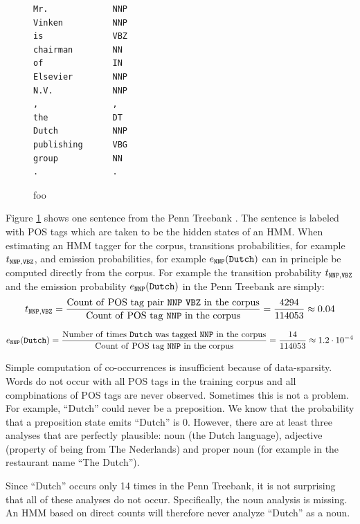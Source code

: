 \begin{figure}[!htb]
\begin{center}
\begin{BVerbatim}
Mr.             NNP
Vinken          NNP
is              VBZ
chairman        NN
of              IN
Elsevier        NNP
N.V.            NNP
,               ,
the             DT
Dutch           NNP
publishing      VBG
group           NN
.               .
\end{BVerbatim}
\end{center}
\caption{foo}\label{penn-figure}
\end{figure}

Figure \ref{penn-figure} shows one sentence from the Penn Treebank \citep{Marcus1993}. The sentence is labeled with POS tags which are taken to be the hidden states of an HMM. When estimating an HMM tagger for the corpus, transitions probabilities, for example $t_{{\tt NNP}, {\tt VBZ}}$, and emission probabilities, for example $e_{{\tt NNP}}({\tt Dutch})$ can in principle be computed directly from the corpus. For example the transition probability $t_{{\tt NNP}, {\tt VBZ}}$ and the emission probability $e_{{\tt NNP}}({\tt Dutch})$ in the Penn Treebank are simply:
$$t_{{\tt NNP}, {\tt VBZ}} = \frac{{\rm Count\ of\ POS\ tag\ pair\ {\tt NNP}\ {\tt VBZ}\ in\ the\ corpus}}{{\rm Count\ of\ POS\ tag\ {\tt NNP}\ in\ the\ corpus}} = \frac{4294}{114053} \approx 0.04$$

$$e_{{\tt NNP}}({\tt Dutch}) = \frac{{\rm Number\ of\ times\ {\tt Dutch}\ was\ tagged\ {\tt NNP}\ in\ the\ corpus}}{{\rm Count\ of\ POS\ tag\ {\tt NNP}\ in\ the\ corpus}} = \frac{14}{114053} \approx 1.2 \cdot 10^{-4}$$

Simple computation of co-occurrences is insufficient because of
data-sparsity. Words do not occur with all POS tags in the training
corpus and all compbinations of POS tags are never observed. Sometimes
this is not a problem. For example, ``Dutch'' could never be a
preposition. We know that the probability that a preposition state
emits ``Dutch'' is $0$. However, there are at least three analyses
that are perfectly plausible: noun (the Dutch language), adjective
(property of being from The Nederlands) and proper noun (for example
in the restaurant name ``The Dutch'').

Since ``Dutch'' occurs only 14 times in the Penn Treebank, it is not
surprising that all of these analyses do not occur. Specifically, the
noun analysis is missing. An HMM based on direct counts will therefore
never analyze ``Dutch'' as a noun.


